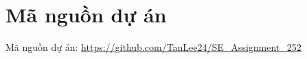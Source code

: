 \newpage
\section{Mã nguồn dự án}

Mã nguồn dự án: \url{https://github.com/TanLee24/SE_Assignment_252}
